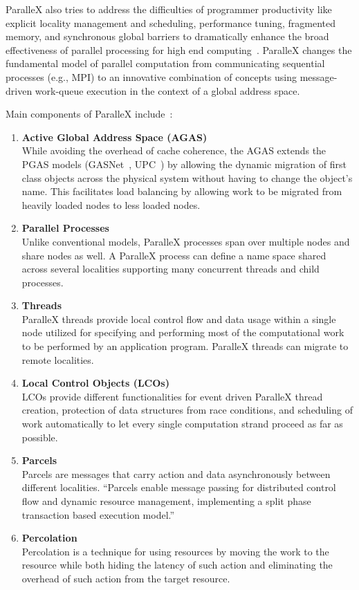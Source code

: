ParalleX also tries to address the difficulties of programmer productivity like explicit locality management and scheduling, performance tuning, fragmented memory, and synchronous global barriers to dramatically enhance the broad effectiveness of parallel processing for high end computing~\cite{4228212}. ParalleX changes the fundamental model of parallel computation from communicating sequential processes (e.g., MPI) to an innovative combination of concepts using message-driven work-queue execution in the context of a global address space.~\cite{tabbal2011preliminary,sterling2014towards}

Main components of ParalleX include~\cite{gao2007parallex,kaiser2009parallex,dekate2012improving}:
\begin{enumerate}
\item \textbf{Active Global Address Space (AGAS)}\\
  While avoiding the overhead of cache coherence, the AGAS extends the PGAS \cite{stitt2009introduction} models (GASNet~\cite{bonachea2002gasnet}, UPC~\cite{upc2005upc}) by allowing the dynamic migration of first class objects across the physical system without having to change the object's name. This facilitates load balancing by allowing work to be migrated from heavily loaded nodes to less loaded nodes.  
\item \textbf{Parallel Processes}\\
  Unlike conventional models, ParalleX processes span over multiple nodes and share nodes as well. A ParalleX process can define a name space shared across several localities supporting many concurrent threads and child processes.
\item \textbf{Threads}\\
  ParalleX threads provide local control flow and data usage within a single node utilized for specifying and performing most of the computational work to be performed by an application program. ParalleX threads can migrate to remote localities. 
\item \textbf{Local Control Objects (LCOs)}\\
  LCOs provide different functionalities for event driven ParalleX thread creation, protection of data structures from race conditions, and scheduling of work automatically to let every single computation strand proceed as far as possible.
\item \textbf{Parcels}\\
  Parcels are messages that carry action and data asynchronously between different localities. ``Parcels enable message passing for distributed control flow and dynamic resource management, implementing a split phase transaction based execution model.''~\cite{kaiser2009parallex}
\item \textbf{Percolation}\\
  Percolation is a technique for using resources by moving the work to the resource while both hiding the latency of such action and eliminating the overhead of such action from the target resource. 
\end{enumerate}


